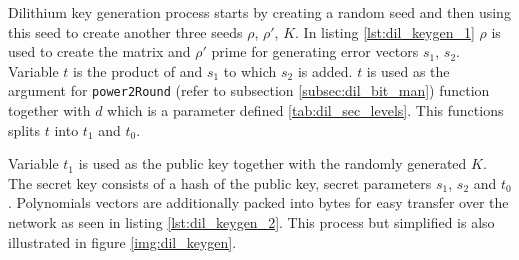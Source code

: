 Dilithium key generation process starts by creating a random seed and then using this seed to create another three seeds $\rho$, $\rho'$, $K$. In listing \ref{lst:dil_keygen_1} $\rho$ is used to create the matrix  and $\rho'$ prime for generating error vectors $s_1$, $s_2$. Variable $t$ is the product of  and $s_1$ to which $s_2$ is added. $t$ is used as the argument for \texttt{power2Round} (refer to subsection \ref{subsec:dil_bit_man}) function together with $d$ which is a parameter defined \ref{tab:dil_sec_levels}. This functions splits $t$ into $t_1$ and $t_0$.

Variable $t_1$ is used as the public key together with the randomly generated $K$. The secret key consists of a hash of the public key, secret parameters $s_1$, $s_2$ and $t_0$. Polynomials vectors are additionally packed into bytes for easy transfer over the network as seen in listing \ref{lst:dil_keygen_2}. This process but simplified is also illustrated in figure \ref{img:dil_keygen}.

